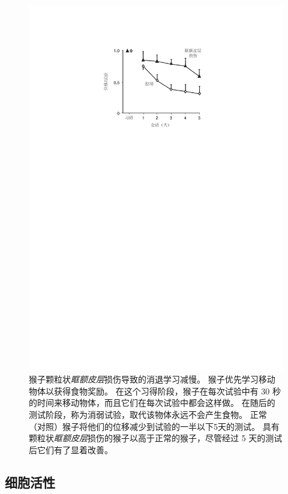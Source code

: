 \begin{figure}[!htb]
	\centering
	\includegraphics{chap4/fig_4_4}
	\caption{猴子颗粒状\textit{眶额皮层}损伤导致的消退学习减慢。
		猴子优先学习移动物体以获得食物奖励。
		在这个习得阶段，猴子在每次试验中有 30 秒的时间来移动物体，而且它们在每次试验中都会这样做。
		在随后的测试阶段，称为消弱试验，取代该物体永远不会产生食物。
		正常（对照）猴子将他们的位移减少到试验的一半以下5天的测试。
		具有颗粒状\textit{眶额皮层}损伤的猴子以高于正常的猴子，尽管经过 5 天的测试后它们有了显着改善\cite{izquierdo2005opposing}。}\label{fig:fig_4_4}
\end{figure}



\subsection{细胞活性}

